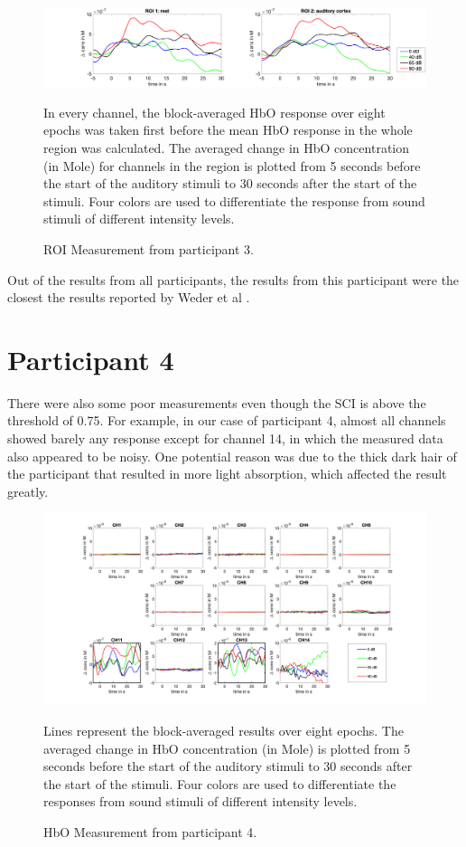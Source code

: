 \begin{figure}[H]
  \centering
    \includegraphics[scale=.3]{bilder/ROI/sub_jonas_s_HbO.png}
  \caption{ROI Measurement from participant  3.}
  \label{fig:roi3}
  \medskip
  \footnotesize {In every channel, the block-averaged HbO response over eight epochs was taken first before the mean HbO response in the whole region was calculated. The averaged change in HbO concentration (in Mole) for channels in the region is plotted from 5 seconds before the start of the auditory stimuli to 30 seconds after the start of the stimuli. Four colors are used to differentiate the response from sound stimuli of different intensity levels.}
\end{figure}

Out of the results from all participants, the results from this participant were the closest the results reported by Weder et al \citeyearpar{Weder2018}. 

\newpage



\section {Participant 4}
There were also some poor measurements even though the SCI is above the threshold of 0.75. For example, in our case of participant 4, almost all channels showed barely any response except for channel 14, in which the measured data also appeared to be noisy. One potential reason was due to the thick dark hair of the participant that resulted in more light absorption, which affected the result greatly.

\begin{figure}[H]
  \centering
    \includegraphics[scale=.35]{bilder/HbO_Mole/sub_lin_s_HbO.png}
  \caption{HbO Measurement from participant 4.}
  \medskip
  \footnotesize {Lines represent the block-averaged results over eight epochs. The averaged change in HbO concentration (in Mole) is plotted from 5 seconds before the start of the auditory stimuli to 30 seconds after the start of the stimuli. Four colors are used to differentiate the responses from sound stimuli of different intensity levels.}
\end{figure}


